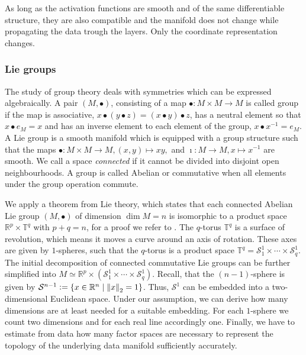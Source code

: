 \documentclass[runningheads,orivec]{llncs}
\begin{document}
As long as the activation functions are smooth and of the same differentiable structure, they are also compatible and the manifold does not change while propagating the data trough the layers. Only the coordinate representation changes.

\subsubsection{Lie groups} The study of group theory deals with symmetries which can be expressed algebraically. A pair $(M,\bullet)$, consisting of a map $\bullet: M\times M \rightarrow M$ is called group if the map is associative, $x \bullet (y \bullet z) = (x \bullet y) \bullet z$, has a neutral element so that $x \bullet e_{M} = x$ and has an inverse element to each element of the group, $x \bullet x^{-1} = e_{M}$. A Lie group is a smooth manifold which is equipped with a group structure such that the maps $\bullet:M \times  M \rightarrow  M, (x,y) \mapsto xy, $ and $\imath: M \rightarrow  M, x \mapsto x^{-1}$ are smooth. We call a space \emph{connected} if it cannot be divided into disjoint open neighbourhoods. A group is called Abelian or commutative when all elements under the group operation commute.

We apply a theorem from Lie theory, which states that each connected Abelian Lie group $(M,\bullet)$ of dimension $\dim M = n$ is isomorphic to a product space $\mathbb{R}^p \times \mathbb{T}^q$ with $p+q =n$, for a proof we refer to \cite[p.~116]{onishchik1993lie}. The $q$-torus $\mathbb{T}^q$ is a surface of revolution, which means it moves a curve around an axis of rotation. These axes are given by $1$-spheres, such that the $q$-torus is a product space $\mathbb{T}^q = \mathcal{S}^1_1 \times \cdots \times \mathcal{S}^1_q$. The initial decomposition of connected commutative Lie groups can be further simplified into $M \simeq \mathbb{R}^p \times (\mathcal{S}^1_1 \times \cdots \times \mathcal{S}^1_q)$. Recall, that the $(n-1)$-sphere is given by $\mathcal{S}^{n-1} := \{x \in \mathbb{R}^n \; \vert \; \norm{x}_2 = 1\}$. Thus, $\mathcal{S}^1$ can be embedded into a two-dimensional Euclidean space. Under our assumption, we can derive how many dimensions are at least needed for a suitable embedding. For each $1$-sphere we count two dimensions and for each real line accordingly one. Finally, we have to estimate from data how many factor spaces are necessary to represent the topology of the underlying data manifold sufficiently accurately.
\end{document}
